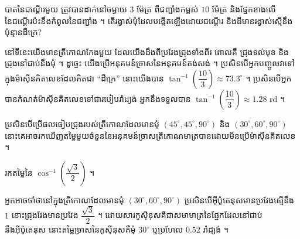\begin{example}[ឧទាហរណ៍]
បាតនៃជណ្តើរមួយ ត្រូវបានដាក់នៅចម្ងាយ $3$ ម៉ែត្រ ពីជញ្ជាំងកម្ពស់ $10$ ម៉ែត្រ និងផ្នែកខាងលើនៃជណ្តើរប៉ះនឹងកំពូលនៃជញ្ជាំង ។ តើរង្វាស់មុំដែលបង្កើតឡើងដោយជណ្តើរ និងដីមានរង្វាស់ស្មើនឹងប៉ុន្មានដឺក្រេ?
\begin{center}
\end{center}
នៅទីនេះយើងមានត្រីកោណកែងមួយ ដែលយើងដឹងពីប្រវែងជ្រុងទាំងពីរ ពោលគឺ ជ្រុងទល់មុខ និងជ្រុងនៅជាប់នឹងមុំ ។ ដូច្នេះ យើងប្រើអនុគមន៍ច្រាសនៃអនុគមន៍តង់សង់ ។ ប្រសិនបើអ្នកបញ្ចូលវាទៅក្នុងម៉ាស៊ីនគិតលេខដែលគិតជា ``ដឺក្រេ'' នោះយើងបាន $\tan^{-1}\left(\dfrac{10}{3}\right) \approx 73.3^\circ$ ។ ប្រសិនបើអ្នកបានកំណត់ម៉ាស៊ីនគិតលេខទៅជារបៀបរ៉ាដ្យង់ អ្នកនឹងទទួលបាន $\tan^{-1}\left(\dfrac{10}{3}\right) \approx 1.28$ rd ។
\end{example}

ប្រសិនបើប្រើផលធៀបជ្រុងរបស់ត្រីកោណដែលមានមុំ $(45^\circ, 45^\circ, 90^\circ)$ និង $(30^\circ, 60^\circ, 90^\circ)$ នោះគេអាចរកឃើញតម្លៃមួយចំនួននៃអនុគមន៍ច្រាសត្រីកោណមាត្របានដោយមិនប្រើម៉ាស៊ីនគិតលេខ ។

\begin{example}[លំហាត់គំរូ ១]
រកតម្លៃនៃ $\cos^{-1}\left(\dfrac{\sqrt{3}}{2}\right)$ ។
\end{example}
\ans
អ្នកអាចចាំថានៅក្នុងត្រីកោណដែលមានមុំ $(30^\circ, 60^\circ, 90^\circ)$ ប្រសិនបើអ៊ីប៉ូតេនុសមានប្រវែងស្មើនឹង $1$ នោះជ្រុងវែងមានប្រវែង $\dfrac{\sqrt{3}}{2}$ ។ ដោយសារកូស៊ីនុសគឺជាសមាមាត្រនៃផ្នែកដែលនៅជាប់នឹងអ៊ីប៉ូតេនុស នោះតម្លៃច្រាសនៃកូស៊ីនុសគឺមុំ $30^\circ$ ឬប្រហែល $0.52$ រ៉ាដ្យង់ ។
\begin{center}
\end{center}

